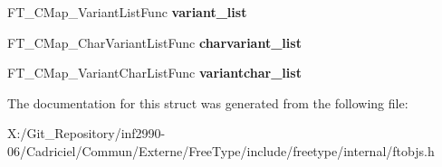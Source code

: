 \begin{DoxyCompactItemize}
\item 
\hypertarget{struct_f_t___c_map___class_rec___ad61635444cbfc71c4259e74cb892c172}{F\-T\-\_\-\-C\-Map\-\_\-\-Variant\-List\-Func {\bfseries variant\-\_\-list}}\label{struct_f_t___c_map___class_rec___ad61635444cbfc71c4259e74cb892c172}

\item 
\hypertarget{struct_f_t___c_map___class_rec___a65db9dfa0e29b7de257dc8870532ab19}{F\-T\-\_\-\-C\-Map\-\_\-\-Char\-Variant\-List\-Func {\bfseries charvariant\-\_\-list}}\label{struct_f_t___c_map___class_rec___a65db9dfa0e29b7de257dc8870532ab19}

\item 
\hypertarget{struct_f_t___c_map___class_rec___ac1563590a0bac99082aa0996b94aad57}{F\-T\-\_\-\-C\-Map\-\_\-\-Variant\-Char\-List\-Func {\bfseries variantchar\-\_\-list}}\label{struct_f_t___c_map___class_rec___ac1563590a0bac99082aa0996b94aad57}

\end{DoxyCompactItemize}


The documentation for this struct was generated from the following file\-:\begin{DoxyCompactItemize}
\item 
X\-:/\-Git\-\_\-\-Repository/inf2990-\/06/\-Cadriciel/\-Commun/\-Externe/\-Free\-Type/include/freetype/internal/ftobjs.\-h\end{DoxyCompactItemize}
